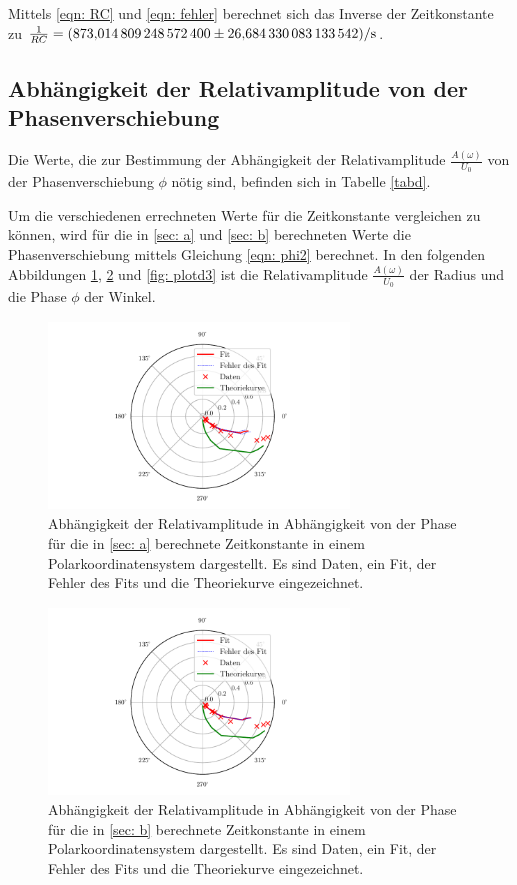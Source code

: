 Mittels \eqref{eqn: RC} und \eqref{eqn: fehler} berechnet sich das Inverse der Zeitkonstante zu
$\frac{1}{RC} = \SI{873.0148092485724  \pm 26.684330083133542}{\per\second}$.

\subsection{Abhängigkeit der Relativamplitude von der Phasenverschiebung}
Die Werte, die zur Bestimmung der Abhängigkeit der Relativamplitude $\frac{A(\omega)}{U_{0}}$ von der
Phasenverschiebung $\phi$ nötig sind, befinden sich in Tabelle \ref{tabd}.

Um die verschiedenen errechneten Werte für die Zeitkonstante vergleichen
zu können, wird für die in \ref{sec: a} und \ref{sec: b} berechneten Werte die Phasenverschiebung mittels
Gleichung \eqref{eqn: phi2} berechnet. In den folgenden Abbildungen \ref{fig: plotd1}, \ref{fig: plotd2} und
\ref{fig: plotd3} ist die Relativamplitude $\frac{A(\omega)}{U_{0}}$ der Radius und die Phase $\phi$ der Winkel.
\begin{figure}
  \centering
  \includegraphics[width=8cm, height=5cm]{build/plotd1.pdf}
  \caption{Abhängigkeit der Relativamplitude in Abhängigkeit von der Phase für die in \ref{sec: a} 
  berechnete Zeitkonstante in einem Polarkoordinatensystem dargestellt. Es sind Daten, ein Fit, der Fehler
  des Fits und die Theoriekurve eingezeichnet.}
  \label{fig: plotd1}
\end{figure}

\begin{figure}
  \centering
  \includegraphics[width=8cm, height=5cm]{build/plotd2.pdf}
  \caption{Abhängigkeit der Relativamplitude in Abhängigkeit von der Phase für die in \ref{sec: b} 
  berechnete Zeitkonstante in einem Polarkoordinatensystem dargestellt. Es sind Daten, ein Fit, der Fehler
  des Fits und die Theoriekurve eingezeichnet.}
  \label{fig: plotd2}
\end{figure}

